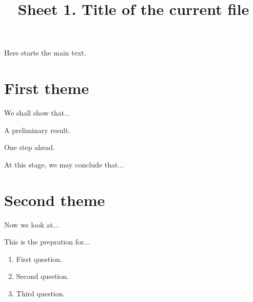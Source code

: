 \documentclass[a4paper, 11pt,
  formal title,
  title in boldface,
  colored solution,
  hide solution,          %
]{homework}
\title{%
                    Sheet 1. Title of the current file
}
\author{}
\date{%
}
\begin{document}
Here starts the main text.


\section*{First theme}

We shall show that...

\begin{problem}
    A preliminary result.
\end{problem}

\begin{solution}
    \blindtext
\end{solution}

\begin{problem}
    One step ahead.

    \blindtext
\end{problem}

\begin{solution}
    \blindtext[2]
\end{solution}

At this stage, we may conclude that...


\section*{Second theme}

Now we look at...

\begin{problem}

    This is the prepration for...

    \begin{enumerate}

        \item
            First question.

            \begin{solution}
                \blindtext
            \end{solution}

        \item
            Second question.

            \begin{solution}
                \blindtext
            \end{solution}

        \item
            Third question.
            \qedhere

            \begin{solution}
                \blindtext
            \end{solution}

    \end{enumerate}
\end{problem}
\end{document}
